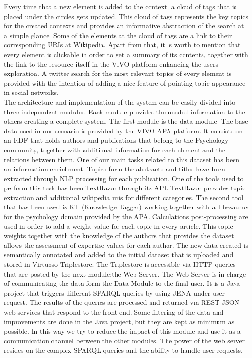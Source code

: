 Every time that a new element is added to the context, a cloud of tags that is placed under the circles gets updated. This cloud of tags represents the key topics for the created contexts and provides an informative abstraction of the search at a simple glance. Some of the elements at the cloud of tags are a link to their corresponding URIs at Wikipedia.
Apart from that, it is worth to mention that every element is clickable in order to get a summary of its contents, together with the link to the resource itself in the VIVO platform enhancing the users exploration. A twitter search for the most relevant topics of every element is provided with the intention of adding a nice feature of pointing topic appearance in social networks.\\

The architecture and implementation of the system can be easily divided into three independent modules. Each module provides the needed information to the others creating a complete system.
The first module is the data module. The base data used in our scenario is provided by the VIVO APA platform. It consists on an RDF that holds authors and publications that belong to the Psychology community, together with additional information for each element and the relations between them. One of our main tasks related to this dataset has been an information enrichment. Topics form the abstracts and titles have been extracted through NLP processing for each publication. One of the tools used to perform this task has been TextRazor through its API. TextRazor provides topic extraction and additional wikipedia uris for different categories. The second tool that has been used is KT (Knowledge Tagger) working together with a Thesaurus for the psychology domain provided by the APA. Calculations post-processing are used in order to add a weight value for each topic in every article. This topic weights together with the knowledge of the authors that provides the dataset allows the assessment of expertise values for each author. The new data created is semantically annotated and added to the initial dataset that is uploaded and stored in Virtuoso Triplestore. The Triplestore is accessible via HTTP queries that are posted by the next module:the Web Server.
The Web Server is in charge of communicating the data form the Data Module to the final user. It is a Java project that triggers different SPARQL queries by using JENA under user request. The results of the queries are processed and returned via REST-JSON web services that respond to the front end. Some filtering of the data and improvements are done in the Java project, but they are kept as minimum as possible. In this way we try to reduce the impact of this module and use it as a communication channel between the other modules. The power of the web server resides on the complex SPARQL queries and the ability to handle user requests.
